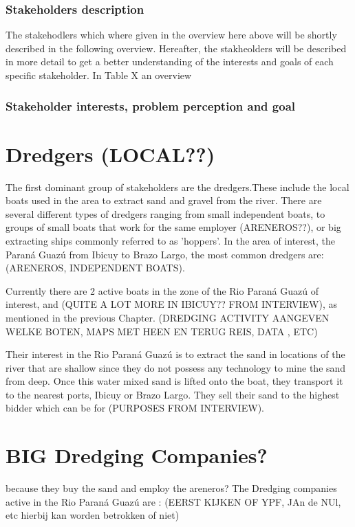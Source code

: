 \subsubsection{Stakeholders description}
The stakehodlers which where given in the overview here above will be shortly described in the following overview. Hereafter, the stakheolders will be described in more detail to get a better understanding of the interests and goals of each specific stakeholder. In Table X an overview 


\subsubsection{Stakeholder interests, problem perception and goal}



\section{Dredgers (LOCAL??)}
The first dominant group of stakeholders are the dredgers.These include the local boats used in the area to extract sand and gravel from the river. There are several different types of dredgers ranging from small independent boats, to groups of small boats that work for the same employer (ARENEROS??), or big extracting ships commonly referred to as 'hoppers'. In the area of interest, the Paraná Guazú from Ibicuy to Brazo Largo, the most common dredgers are: (ARENEROS, INDEPENDENT BOATS). 

Currently there are 2 active boats in the zone of the Rio Paraná Guazú of interest, and (QUITE A LOT MORE IN IBICUY?? FROM INTERVIEW), as mentioned in the previous Chapter. (DREDGING ACTIVITY AANGEVEN WELKE BOTEN, MAPS MET HEEN EN TERUG REIS, DATA , ETC)

Their interest in the Rio Paraná Guazú is to extract the sand in locations of the river that are shallow since they do not possess any technology to mine the sand from deep. Once this water mixed sand is lifted onto the boat, they transport it to the nearest ports, Ibicuy or Brazo Largo. They sell their sand to the highest bidder which can be for (PURPOSES FROM INTERVIEW).


\section{BIG Dredging Companies?}
because they buy the sand and employ the areneros?
The Dredging companies active in the Rio Paraná Guazú are :
(EERST KIJKEN OF YPF, JAn de NUl, etc hierbij kan worden betrokken of niet)


